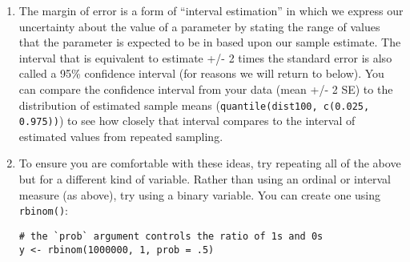 \documentclass[a4paper,12pt]{article}
\begin{document}
\begin{enumerate}
\begin{verbatim}
# five samples of size n = 5
replicate(5, mean(sample(x, 5, FALSE)))

# 1,000 samples of size n = 5
dist5 <- replicate(1000, mean(sample(x, 5, FALSE)))

# 100 samples of size n = 100
dist100 <- replicate(100, mean(sample(x, 100, FALSE)))
\end{verbatim}

\noindent This vector of sample means is often called the ``sampling distribution'' of the mean. This term refers to the distribution of a given statistic across repeated samples of the same size from a population.\footnote{So hear we focus on the sampling distribution of the mean, but we could also create a sampling distribution for the maximum of each sample, for the count of observations with 10 years of education, the proportion with more than 12 years, etc. The process works the same for any sample statistic, we just focus here on the mean.} Note that these operations may take some time. When they are done, examine the results:

\begin{itemize}
\item What does the histogram look like: \texttt{ggplot(, aes(x = dist5)) + geom\_histogram(bins = 21)} ?
\item Are the sample means ``unbiased'' (meaning the mean of the sample means is close to the population mean): \texttt{mean(dist5)} \texttt{mean(dist100)}?
\item How does the standard deviation of the sample means correspond to the standard errors you calculated above: \texttt{sd(dist5)} and \texttt{sd(dist100)} ?
\end{itemize}

\item The margin of error is a form of ``interval estimation'' in which we express our uncertainty about the value of a parameter by stating the range of values that the parameter is expected to be in based upon our sample estimate. The interval that is equivalent to estimate +/- 2 times the standard error is also called a 95\% confidence interval (for reasons we will return to below). You can compare the confidence interval from your data (mean +/- 2 SE) to the distribution of estimated sample means (\texttt{quantile(dist100, c(0.025, 0.975))}) to see how closely that interval compares to the interval of estimated values from repeated sampling.

\item To ensure you are comfortable with these ideas, try repeating all of the above but for a different kind of variable. Rather than using an ordinal or interval measure (as above), try using a binary variable. You can create one using \texttt{rbinom()}:

\begin{verbatim}
# the `prob` argument controls the ratio of 1s and 0s
y <- rbinom(1000000, 1, prob = .5) 
\end{verbatim}


\end{enumerate}
\end{document}
